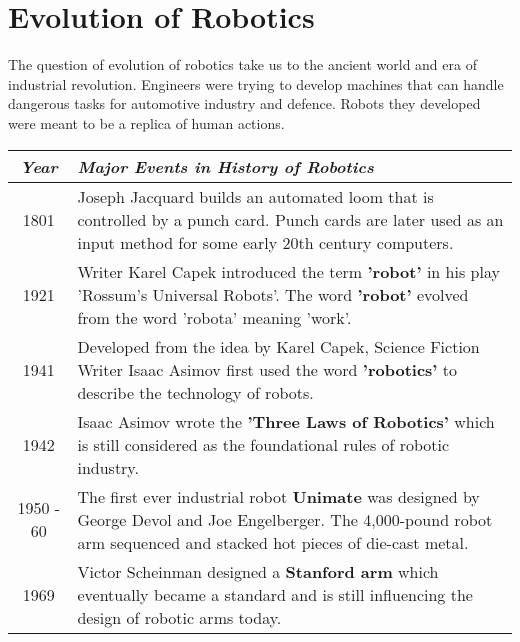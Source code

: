 \section{Evolution of Robotics}
\par The question of evolution of robotics take us to the ancient world and era of industrial revolution. Engineers were trying to develop machines that can handle dangerous tasks for automotive industry and defence. Robots they developed were meant to be a replica of human actions. 
\begin{table*}
    \centering
    \begin{tabular}{|c|p{14cm}|}
    \hline
        \textbf{\textit{Year}} & \hspace{30mm}\textbf{\textit{Major Events in History of Robotics}} \\ \hline
        
        \rowcolor[gray]{0.95} 1801 & Joseph Jacquard builds an automated loom that is controlled by a punch card. Punch cards are later used as an input method for some early 20th century computers. \\ \hline
        
        1921 & Writer Karel Capek introduced the term \textbf{'robot'} in his play 'Rossum's Universal Robots'. The word \textbf{'robot'} evolved from the word 'robota' meaning 'work'. \\ \hline
        
        \rowcolor[gray]{0.95} 1941 & Developed from the idea by Karel Capek, Science Fiction Writer Isaac Asimov first used the word \textbf{'robotics'} to describe the technology of robots. \\ \hline
        
        1942 & Isaac Asimov wrote the \textbf{'Three Laws of Robotics'} which is still considered as the foundational rules of robotic industry. \\ \hline
        
        \rowcolor[gray]{0.95} 1950 - 60 & The first ever industrial robot \textbf{Unimate} was designed by George Devol and Joe Engelberger. The 4,000-pound robot arm sequenced and stacked hot pieces of die-cast metal. \\ \hline
        
        1969 & Victor Scheinman designed a \textbf{Stanford arm} which eventually became a standard and is still influencing the design of robotic arms today. \\ \hline
        

\end{tabular}
\end{table*}
